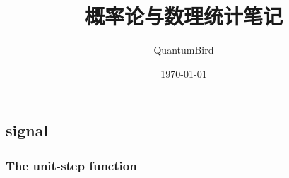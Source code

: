 \documentclass[UTF8]{ctexart}
\title{概率论与数理统计笔记}
\author{QuantumBird}
\date{\today}
\begin{document}
	\subsection{signal}
		\subsubsection{The unit-step function}
		
\end{document}
